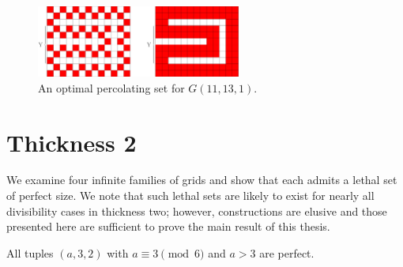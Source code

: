 \begin{figure}[]
\centering
\includegraphics[width=0.6\textwidth]{figures/7/11x13x1.pdf}
\caption{An optimal percolating set for $G(11,13,1)$.}
\label{fig:11x13x1}
\end{figure} 


\section{Thickness 2}

We examine four infinite families of grids and show that each admits a lethal set of perfect size. We note that such lethal sets are likely to exist for nearly all divisibility cases in thickness two; however, constructions are elusive and those presented here are sufficient to prove the main result of this thesis.

\begin{con}
\label{con:3x2x(3mod6)}
All tuples $(a,3,2)$ with $a \equiv 3 \pmod 6$ and $a >3$ are perfect. 
\end{con}

